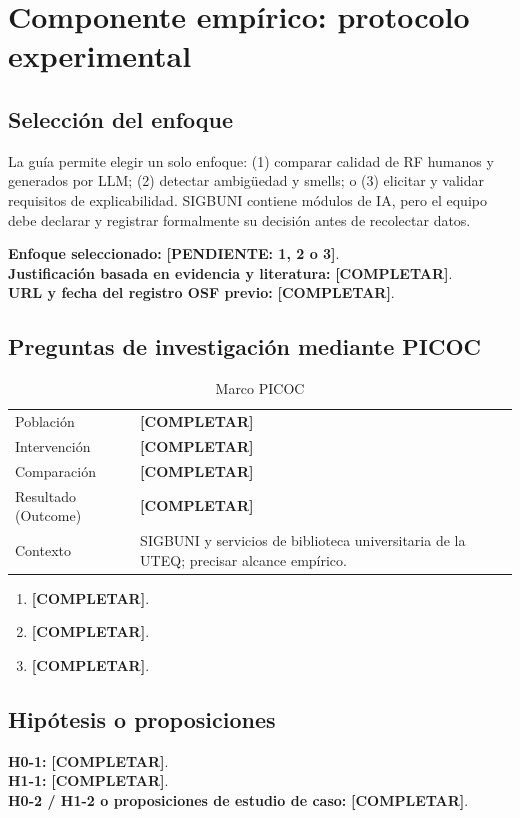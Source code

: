 \documentclass[12pt,journal,onecolumn]{IEEEtran}
\newcommand{\pendiente}[1]{\textcolor{red!70!black}{\textbf{[PENDIENTE: #1]}}}
\newcommand{\completar}{\textcolor{red!70!black}{\textbf{[COMPLETAR]}}}
\begin{document}
\section{Componente empírico: protocolo experimental}
\subsection{Selección del enfoque}
La guía permite elegir un solo enfoque: (1) comparar calidad de RF humanos y generados por LLM; (2) detectar ambigüedad y smells; o (3) elicitar y validar requisitos de explicabilidad. SIGBUNI contiene módulos de IA, pero el equipo debe declarar y registrar formalmente su decisión antes de recolectar datos.

\textbf{Enfoque seleccionado:} \pendiente{1, 2 o 3}.\\
\textbf{Justificación basada en evidencia y literatura:} \completar.\\
\textbf{URL y fecha del registro OSF previo:} \completar.

\subsection{Preguntas de investigación mediante PICOC}
\begin{table}[H]\centering
\caption{Marco PICOC}
\begin{tabularx}{\textwidth}{P{0.18\textwidth}Y}\toprule
Población & \completar\\
Intervención & \completar\\
Comparación & \completar\\
Resultado (Outcome) & \completar\\
Contexto & SIGBUNI y servicios de biblioteca universitaria de la UTEQ; precisar alcance empírico.\\\bottomrule
\end{tabularx}
\end{table}

\begin{enumerate}[label=RQ\arabic*:]
\item \completar.
\item \completar.
\item \completar.
\end{enumerate}

\subsection{Hipótesis o proposiciones}
\textbf{H0-1:} \completar.\\
\textbf{H1-1:} \completar.\\
\textbf{H0-2 / H1-2 o proposiciones de estudio de caso:} \completar.
\end{document}
